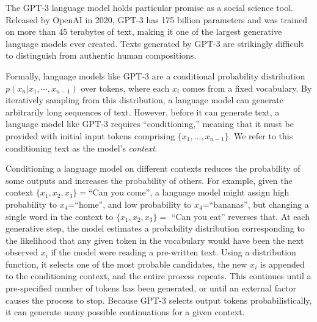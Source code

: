 \documentclass[11pt]{article}
\begin{document}
The GPT-3 language model holds particular promise as a social science tool. Released by OpenAI in 2020, GPT-3 has 175 billion parameters and was trained on more than 45 terabytes of text, making it one of the largest generative language models ever created. Texts generated by GPT-3 are strikingly difficult to distinguish from authentic human compositions.

Formally, language models like GPT-3 are a conditional probability distribution $p(x_n|x_1,\cdots,x_{n-1})$ over tokens,
where each $x_i$ comes from a fixed vocabulary.
By iteratively sampling from this distribution, a language model can generate arbitrarily long sequences of text.
However, before it can generate text, a language model like GPT-3 requires ``conditioning,'' meaning that it must be provided with initial input tokens comprising $\{x_1, ..., x_{n-1}\}$. We refer to this conditioning text as the model's \emph{context}.

Conditioning a language model on different contexts reduces the probability of some outputs and increases the probability of others. For example, given the context $\{x_1,x_2,x_3\}=$``Can you come'', a language model might assign high probability to $x_4$=``home'', and low probability to $x_4$=``bananas'', but changing a single word in the context to $\{x_1,x_2,x_3\}=$ ``Can you eat'' reverses that. At each generative step, the model estimates a probability distribution corresponding to the likelihood that any given token in the vocabulary would have been the next observed $x_i$ if the model were reading a pre-written text. Using a distribution function, it selects one of the most probable candidates, the new $x_i$ is appended to the conditioning context, and the entire process repeats. This continues until a pre-specified number of tokens has been generated, or until an external factor causes the process to stop. Because GPT-3 selects output tokens probabilistically, it can generate many possible continuations for a given context. %
\end{document}
